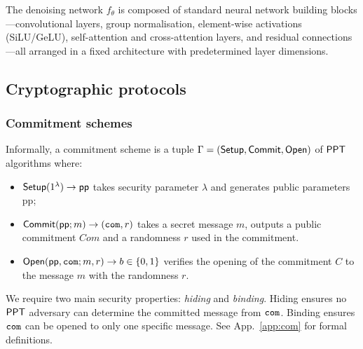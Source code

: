 The denoising network $f_\theta$ is composed of standard neural network building blocks---convolutional layers, group normalisation, element-wise activations (SiLU/GeLU), self-attention and cross-attention layers, and residual connections---all arranged in a fixed architecture with predetermined layer dimensions.

\subsection{Cryptographic protocols}

\subsubsection{Commitment schemes}
\label{def: commitment}
Informally, a commitment scheme is a tuple $\Gamma = (\mathsf{Setup},\allowbreak \mathsf{Commit}, \mathsf{Open})$ of $\mathsf{PPT}$ algorithms where: 
\begin{itemize} [itemsep=0em,nosep]
        \item $\mathsf{Setup}(1^{\lambda}) \rightarrow \mathsf{pp}$ takes security parameter $\lambda$ and generates public parameters $\text{pp}$;
        \item $\mathsf{Commit}(\mathsf{pp}; m) \rightarrow (\mathtt{com},r)$ takes a secret message $m$, outputs a public commitment $Com$ and a randomness $r$ used in the commitment.
        \item $\mathsf{Open}(\mathsf{pp}, \mathtt{com}; m, r) \rightarrow b \in \{0,1\}$ verifies the opening of the commitment $C$ to the message $m$ with the randomness $r$.
\end{itemize}

We require two main security properties: \emph{hiding} and \emph{binding}. Hiding ensures no $\mathsf{PPT}$ adversary can determine the committed message from $\mathtt{com}$. Binding ensures $\mathtt{com}$ can be opened to only one specific message. See App.~\ref{app:com} for formal definitions.


